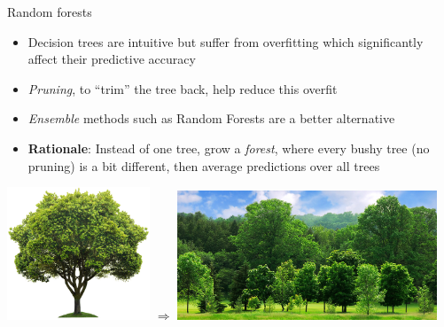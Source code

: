\documentclass[pdf]{beamer}
\begin{document}
\begin{frame}{Random forests}
\begin{itemize}\addtolength{\itemsep}{0.1\baselineskip}
	\item Decision trees are intuitive but suffer from overfitting which significantly affect their predictive accuracy
	\item \textit{Pruning}, to ``trim'' the tree back, help reduce this overfit
	\item \textit{Ensemble} methods such as Random Forests are a better alternative
	\item \textbf{Rationale}: Instead of one tree, grow a \textit{forest}, where every bushy tree (no pruning) is a bit different,
	then average predictions over all trees
\end{itemize}
\vfill
\begin{center}
	\includegraphics[width=0.32\textwidth]{tree.jpg}
	\Huge $\Rightarrow$ \normalsize
	\includegraphics[width=0.58\textwidth]{forest.jpg}
\end{center}
\end{frame}
\end{document}
